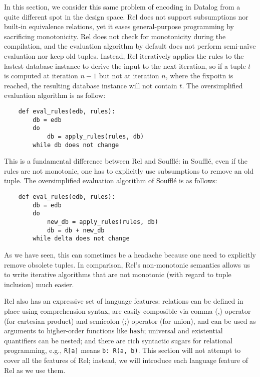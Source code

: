 In this section, we consider this same problem of encoding \egraphs in Datalog
 from a quite different spot in the design space.
Rel does not support subsumptions nor built-in equivalence relations,
 yet it eases general-purpose programming by sacrificing monotonicity.
Rel does not check for monotonicity during the compilation, 
 and the evaluation algorithm by default does not perform semi-na\"ive evaluation
 nor keep old tuples.
Instead, Rel iteratively applies the rules to the lastest database instance 
 to derive the input to the next iteration, 
 so if a tuple $t$ is computed at iteration $n-1$ but not at iteration $n$, 
 where the fixpoitn is reached, the resulting database instance will not contain $t$.
The oversimplified evaluation algorithm is as follow:
\begin{verbatim}
    def eval_rules(edb, rules):
        db = edb
        do
            db = apply_rules(rules, db)
        while db does not change
\end{verbatim}
This is a fundamental difference between Rel and Souffl\'e:
 in Souffl\'e, even if the rules are not monotonic,
 one has to explicitly use subsumptions to remove an old tuple.
The oversimplified evaluation algorithm of Souffl\'e is as follows:
\begin{verbatim}
    def eval_rules(edb, rules):
        db = edb
        do
            new_db = apply_rules(rules, db)
            db = db + new_db
        while delta does not change
\end{verbatim}
As we have seen, this can sometimes be a headache 
 because one need to explicitly remove obsolete tuples.
In comparison,
 Rel's non-monotonic semantics allows us to write iterative algorithms that are
 not monotonic (with regard to tuple inclusion) much easier.

Rel also has an expressive set of language features:
 relations can be defined in place using comprehension syntax,
 are easily composible via comma (,) operator (for cartesian product) 
 and semicolon (;) operator (for union),
 and can be used as arguments to higher-order functions like \verb|hash|;
 universal and existential quantifiers can be nested;
 and there are rich syntactic sugars for relational programming, e.g.,
 \verb|R[a]| means \verb|b: R(a, b)|.
This section will not attempt to cover all the features of Rel;
 instead, we will introduce each language feature of Rel as we use them.

